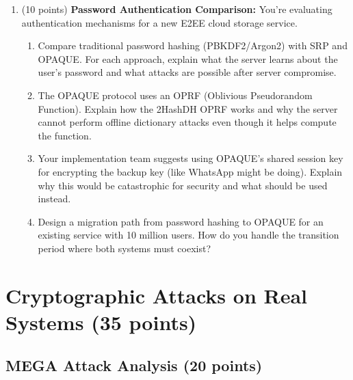 \documentclass[10pt,a4paper,american]{exam}
\begin{document}
\begin{enumerate}
	\item (10 points) \textbf{Password Authentication Comparison:}
	      You're evaluating authentication mechanisms for a new E2EE cloud storage service.
	      \begin{enumerate}
		      \item Compare traditional password hashing (PBKDF2/Argon2) with SRP and OPAQUE. For each approach, explain what the server learns about the user's password and what attacks are possible after server compromise.
		      \item The OPAQUE protocol uses an OPRF (Oblivious Pseudorandom Function). Explain how the 2HashDH OPRF works and why the server cannot perform offline dictionary attacks even though it helps compute the function.
		      \item Your implementation team suggests using OPAQUE's shared session key for encrypting the backup key (like WhatsApp might be doing). Explain why this would be catastrophic for security and what should be used instead.
		      \item Design a migration path from password hashing to OPAQUE for an existing service with 10 million users. How do you handle the transition period where both systems must coexist?
	      \end{enumerate}
\end{enumerate}

\section{Cryptographic Attacks on Real Systems (35 points)}

\subsection{MEGA Attack Analysis (20 points)}
\end{document}
